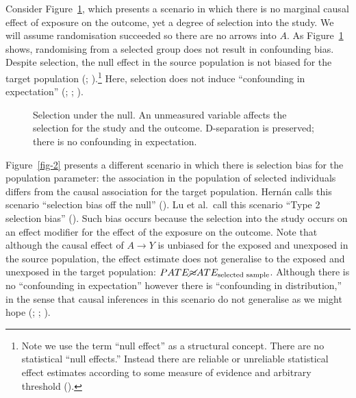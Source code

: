 \documentclass[
  singlecolumn,
  9pt]{article}
\begin{document}
Consider Figure~\ref{fig-1}, which presents a scenario in which there is
no marginal causal effect of exposure on the outcome, yet a degree of
selection into the study. We will assume randomisation succeeded so
there are no arrows into \(A\). As Figure~\ref{fig-1} shows, randomising
from a selected group does not result in confounding bias. Despite
selection, the null effect in the source population is not biased for
the target population (;
).\footnote{Note
  we use the term ``null effect'' as a structural concept. There are no
  statistical ``null effects.'' Instead there are reliable or unreliable
  statistical effect estimates according to some measure of evidence and
  arbitrary threshold ().} Here, selection does not induce ``confounding in
expectation'' (;
;
).

\begin{figure}


\caption{\label{fig-1}Selection under the null. An unmeasured variable
affects the selection for the study and the outcome. D-separation is
preserved; there is no confounding in expectation.}

\end{figure}%

Figure~\ref{fig-2} presents a different scenario in which there is
selection bias for the population parameter: the association in the
population of selected individuals differs from the causal association
for the target population. Hernán calls this scenario ``selection bias
off the null'' (). Lu et
al.~call this scenario ``Type 2 selection bias''
(). Such bias occurs because
the selection into the study occurs on an effect modifier for the effect
of the exposure on the outcome. Note that although the causal effect of
\(A\to Y\) is unbiased for the exposed and unexposed in the source
population, the effect estimate does not generalise to the exposed and
unexposed in the target population:
\(PATE \cancel{\approx} ATE_{\text{selected sample}}\). Although there
is no ``confounding in expectation'' however there is ``confounding in
distribution,'' in the sense that causal inferences in this scenario do
not generalise as we might hope (; ; ).
\end{document}
